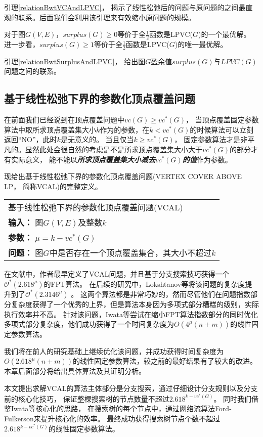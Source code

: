 引理\ref{relationBwtVCAndLPVC}， 揭示了线性松弛后的问题与原问题的之间最直观的联系。后面我们会利用该引理来有效缩小原问题的规模。

\begin{lemma}\label{relationBwtSurplusAndLPVC}
对于图$G(V, E)$，$surplus(G) \ge 0$等价于全$\frac{1}{2}$函数是LPVC($G$)的一个最优解。
进一步看，$surplus(G) \ge 1$等价于全$\frac{1}{2}$函数是LPVC($G$)的唯一最优解。
\end{lemma}

引理\ref{relationBwtSurplusAndLPVC}， 给出图$G$盈余值$surplus(G)$与$LPVC(G)$问题之间的联系。


\subsection{基于线性松弛下界的参数化顶点覆盖问题}
在前面我们已经说到在顶点覆盖问题中$vc(G)\ge vc^*(G)$，
当顶点覆盖固定参数算法中取所求顶点覆盖集大小$k$作为的参数，在$k < vc^*(G)$的时候算法可以立刻返回“NO”，此时$k$是无意义的。
当且仅当$k \ge vc^*(G)$， 固定参数算法才是非平凡的。显然此处会很自然的考虑是不是所求顶点覆盖集大小大于$vc^*(G)$的部分才有实际意义，
能不能以\textbf{\emph{所求顶点覆盖集大小减去$vc^*(G)$的值}}作为参数。

现给出基于线性松弛下界的参数化顶点覆盖问题(VERTEX COVER ABOVE LP， 简称VCAL)的完整定义。\\

\begin{tabular}{| p{0.9\headwidth} |}
  \hline
  基于线性松弛下界的参数化顶点覆盖问题(VCAL) \\
  \textbf{输入：} 图$G(V, E)$及整数$k$ \\
  \textbf{参数：} $\mu = k - vc^*(G)$\\
  \textbf{问题：} 图$G$中是否存在一个顶点覆盖集合，其大小不超过$k$\\
  \hline
\end{tabular} \vspace{0.5cm}


在文献\cite{narayanaswamy2012lp}中，作者最早定义了VCAL问题，并且基于分支搜索技巧获得一个$\mathcal{O}^*(2.618^{\mu})$的FPT算法。
在后续的研究中，Lokshtanov等将该问题的复杂度提升到了$\mathcal{O}^*(2.3146^{\mu})$ 。
这两个算法都是非常巧妙的，然而尽管他们在问题指数部分复杂度获得了一个优秀的上界，但是算法本身因为多项式部分糟糕的级别，实际执行效率并不高。
针对该问题，Iwata等尝试在缩小FPT算法指数部分的同时优化多项式部分复杂度，他们成功获得了一个时间复杂度为$O(4^{\mu}(n+m))$的线性固定参数算法。

我们将在前人的研究基础上继续优化该问题，并成功获得时间复杂度为$O(2.618^{\mu}(n+m))$的线性固定参数算法，较之前的最好结果有了较大的改进。
本章后面部分将给出具体算法及其证明分析。

本文提出求解VCAL的算法主体部分是分支搜索，通过仔细设计分支规则以及分支前的核心化技巧，
保证整棵搜索树的节点数量不超过$2.618^{k-vc^*(G)}$。
同时我们借鉴Iwata等核心化的思路，
在搜索树的每个节点中，通过网络流算法Ford-Fulkerson来提升核心化的效率。
最终成功获得搜索树节点个数不超过$2.618^{k-vc^*(G)}$的线性固定参数算法。
